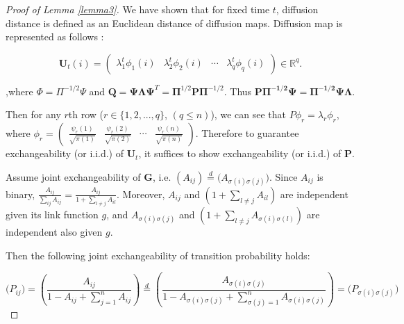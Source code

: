 \documentclass[12pt]{article}
\theoremstyle{definition}
\begin{document}
	
	\begin{proof}[Proof of Lemma \ref{lemma3}]
		
		We have shown that for fixed time $t$, diffusion distance is defined as an Euclidean distance of diffusion maps. Diffusion map is represented as follows :
		
		\begin{equation}
		\boldsymbol{U}_{t}(i) = \begin{pmatrix} \lambda^{t}_{1} \phi_{1}(i) & \lambda^{t}_{2} \phi_{2} (i)  & \cdots & \lambda^{t}_{q} \phi_{q}(i) \end{pmatrix} \in \mathbb{R}^{q}.
		\end{equation}
		
		,where $\Phi = \Pi^{-1/2}\Psi$ and $\mathbf{Q}=\mathbf{\Psi}\mathbf{\Lambda}\mathbf{\Psi}^{T} = \mathbf{\Pi}^{1/2} \mathbf{P} \mathbf{\Pi}^{-1/2}$. 
		Thus $\mathbf{P \Pi^{-1/2} \Psi = \Pi^{-1/2} \Psi \Lambda}$. 
		
		Then for any $r$th row ($r \in \{1,2, ... , q \}$, $(q \leq n)$), we can see that $P \phi_{r} = \lambda_{r} \phi_{r}$, where $\phi_{r} = \begin{pmatrix}  \frac{\psi_{r}(1)}{\sqrt{\pi(1)}} & \frac{\psi_{r}(2)}{\sqrt{\pi(2)}} & \cdots & \frac{\psi_{r}(n)}{\sqrt{\pi(n)}} \end{pmatrix}$.
		Therefore to guarantee exchangeability (or i.i.d.) of $\mathbf{U}_{t}$, it suffices to show exchangeability (or i.i.d.) of $\mathbf{P}$.
		
		Assume joint exchangeability of $\mathbf{G}$, i.e. $(A_{ij}) \stackrel{d}{=} \big( A_{\sigma(i) \sigma(j)} \big)$. 
		Since $A_{ij}$ is binary, $\frac{A_{ij}}{\sum\limits_{ij} A_{ij}} = \frac{A_{ij}}{ 1 + \sum\limits_{l \neq j} A_{il}}$. Moreover, $A_{ij}$ and $(1 + \sum\limits_{l \neq j} A_{il})$ are independent given its link function $g$, and $A_{\sigma(i) \sigma(j)}$ and $(1 + \sum\limits_{l \neq j} A_{\sigma(i) \sigma(l)})$ are independent also given $g$.
		
		Then the following joint exchangeability of transition probability holds:
		
		\begin{equation}
		\big( P_{ij} \big) = \left(  \frac{A_{ij}}{1 - A_{ij} + \sum\limits_{j=1}^{n} A_{ij} } \right)  \stackrel{d}{=} \left( \frac{A_{\sigma(i) \sigma(j)} }{1 - A_{\sigma(i) \sigma(j)} + \sum\limits_{\sigma(j) = 1}^{n} A_{\sigma(i) \sigma(j)} } \right) = \big( P_{\sigma(i) \sigma(j)} \big)
		\end{equation}
		

\end{proof}
\end{document}
